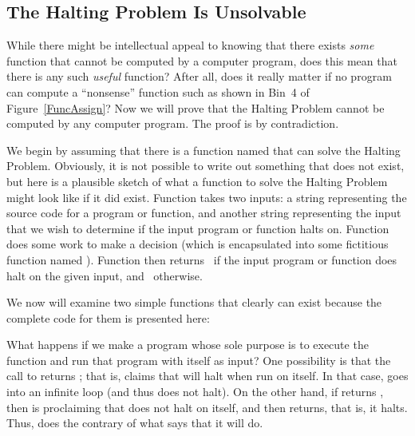 \newpage

\subsection{The Halting Problem Is Unsolvable}
\label{HaltSec}

While there might be intellectual appeal to knowing
that there exists \emph{some} function that cannot be computed by a
computer program, does this mean that there is any such \emph{useful}
function? 
After all, does it really matter if no program can compute a
``nonsense'' function such as shown in Bin~4 of Figure~\ref{FuncAssign}?
Now we will prove that the Halting Problem cannot be computed by any
computer program.
The proof is by contradiction.

We begin by assuming that there is a function named  that
can solve the Halting Problem.
Obviously, it is not possible to write out something that does not
exist, but here is a plausible sketch of what a function to solve the
Halting Problem might look like if it did exist.
Function  takes two inputs: a string representing the
source code for a program or function, and another string
representing the input that we wish to determine if the input program
or function halts on.
Function  does some work to make a decision (which is
encapsulated into some fictitious function named ).
Function  then returns \TRUE\ if the input program or
function does halt on the given input, and \FALSE\ otherwise.


We now will examine two simple functions that clearly can exist
because the complete code for them is presented here:


What happens if we make a program whose sole purpose is to execute
the function  and run that program with itself as
input?
One possibility is that the call to  returns \TRUE;
that is,  claims that  will halt when
run on itself.
In that case,  goes into an infinite loop (and thus
does not halt).
On the other hand, if  returns \FALSE, then 
is proclaiming that  does not halt on itself, and
 then returns, that is, it halts.
Thus,  does the contrary of what  says that
it will do.

